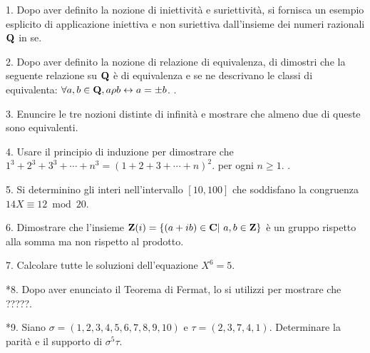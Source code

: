 \item{1.} Dopo aver definito la nozione di iniettivit\`a e suriettivit\`a, si fornisca un esempio esplicito di
applicazione iniettiva e non suriettiva dall'insieme dei numeri razionali ${\bf Q}$ in se.
\ve\vs   %
\item{2.} Dopo aver definito la nozione di relazione di equivalenza, di dimostri che 
la seguente relazione su ${\bf Q}$ è di equivalenza e se ne descrivano le classi di equivalenta:
$\forall a,b\in{\bf Q}, a\rho b \leftrightarrow a=\pm b$. %
.\vv
\item{3.} Enuncire le tre nozioni distinte di infinit\`a e mostrare che almeno due di queste sono equivalenti.
\ve\vs   %
\item{4.} Usare il principio di induzione per dimostrare che $1^3 + 2^3 + 3^3 + \cdots + n^3 = (1 + 2 + 3 + \cdots + n)^2. $ per ogni $n\ge1$.
.\ve\vs   %
\item{5.} Si determinino gli interi nell'intervallo $[10,100]$ che soddisfano la congruenza $14X\equiv 12\bmod 20$.
\vv
\item{6.} Dimostrare che l'insieme
${\bf Z}(i)=\{(a+ib)\in{\bf C}|\ a,b\in{\bf Z}\}$
\`e un gruppo rispetto alla somma ma non rispetto al prodotto.
\ve\vs   %
\item{7.} %
Calcolare tutte le soluzioni dell'equazione $X^6=5$.\ve \vs  %
\item{*8.} Dopo aver enunciato il Teorema di Fermat, lo si utilizzi per mostrare che ?????.
\vv
\item{*9.} %
Siano $\sigma=(1,2,3,4,5,6,7,8,9,10)$ e $\tau=(2,3,7,4,1)$.
Determinare la parit\`a e il supporto di  $\sigma^5\tau$.\ \ve %
\bye
